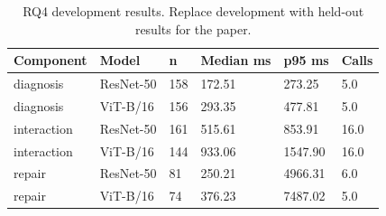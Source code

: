 \begin{table}[t]
\centering
\caption{RQ4 development results. Replace development with held-out results for the paper.}
\label{tab:rq4}
\begin{tabular}{llllll}
\toprule
Component & Model & n & Median ms & p95 ms & Calls \\
\midrule
diagnosis & ResNet-50 & 158 & 172.51 & 273.25 & 5.0 \\
diagnosis & ViT-B/16 & 156 & 293.35 & 477.81 & 5.0 \\
interaction & ResNet-50 & 161 & 515.61 & 853.91 & 16.0 \\
interaction & ViT-B/16 & 144 & 933.06 & 1547.90 & 16.0 \\
repair & ResNet-50 & 81 & 250.21 & 4966.31 & 6.0 \\
repair & ViT-B/16 & 74 & 376.23 & 7487.02 & 5.0 \\
\bottomrule
\end{tabular}
\end{table}
